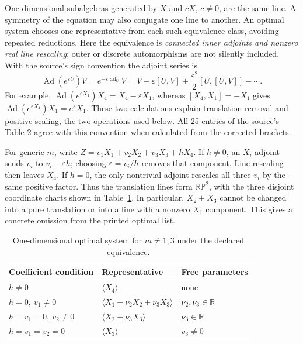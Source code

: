 One-dimensional subalgebras generated by $X$ and $cX$, $c\ne0$, are the
same line. A symmetry of the equation may also conjugate one line to
another. An optimal system chooses one representative from each such
equivalence class, avoiding repeated reductions. Here the equivalence is
\emph{connected inner adjoints and nonzero real line rescaling}; outer or
discrete automorphisms are not silently included. With the source's sign
convention the adjoint series is
\begin{equation}
 \operatorname{Ad}(e^{\varepsilon U})V
 =e^{-\varepsilon\operatorname{ad}_U}V
 =V-\varepsilon[U,V]+\frac{\varepsilon^2}{2}[U,[U,V]]-\cdots.
 \label{eq:sve-adjoint-series}
\end{equation}
For example,
$\operatorname{Ad}(e^{\varepsilon X_1})X_4=X_4-\varepsilon X_1$,
whereas $[X_4,X_1]=-X_1$ gives
$\operatorname{Ad}(e^{\varepsilon X_4})X_1=e^\varepsilon X_1$.
These two calculations explain translation removal and positive scaling,
the two operations used below. All 25 entries of the source's Table 2
agree with this convention when calculated from the corrected brackets.

For generic $m$, write $Z=v_1X_1+v_2X_2+v_3X_3+hX_4$.
If $h\ne0$, an $X_i$ adjoint sends $v_i$ to $v_i-\varepsilon h$;
choosing $\varepsilon=v_i/h$ removes that component. Line rescaling then
leaves $X_4$. If $h=0$, the only nontrivial adjoint rescales all three
$v_i$ by the same positive factor. Thus the translation lines form
$\mathbb{RP}^2$, with the three disjoint coordinate charts shown in
Table~\ref{tab:sve-optimal-generic}. In particular, $X_2+X_3$ cannot
be changed into a pure translation or into a line with a nonzero $X_1$
component. This gives a concrete omission from the printed optimal list.

\begin{table}[htbp]
\centering\small
\begin{tabular}{@{}lll@{}}
\toprule
Coefficient condition & Representative & Free parameters\\
\midrule
$h\ne0$ & $\langle X_4\rangle$ & none\\
$h=0,\ v_1\ne0$ & $\langle X_1+\nu_2X_2+\nu_3X_3\rangle$ & $\nu_2,\nu_3\in\mathbb R$\\
$h=v_1=0,\ v_2\ne0$ & $\langle X_2+\nu_3X_3\rangle$ & $\nu_3\in\mathbb R$\\
$h=v_1=v_2=0$ & $\langle X_3\rangle$ & $v_3\ne0$\\
\bottomrule
\end{tabular}
\caption{One-dimensional optimal system for $m\ne1,3$ under the declared equivalence.}
\label{tab:sve-optimal-generic}
\end{table}

